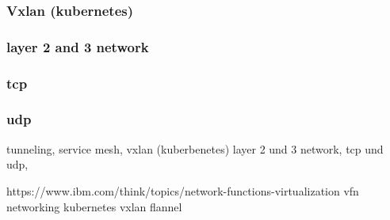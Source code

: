 \subsubsection{Vxlan (kubernetes)}


\subsubsection{layer 2 and 3 network}


\subsubsection{tcp}


\subsubsection{udp}

tunneling, service mesh, vxlan (kuberbenetes) layer 2 und 3 network, tcp und udp,

https://www.ibm.com/think/topics/network-functions-virtualization
vfn networking
kubernetes vxlan flannel